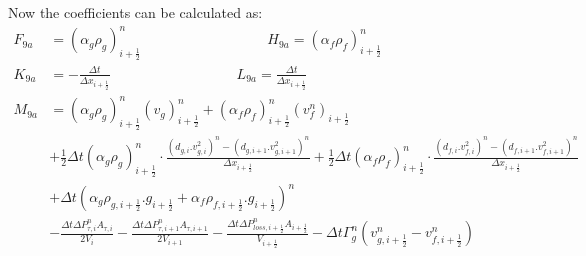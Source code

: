 \documentclass[11pt,letterpaper,titlepage]{article}
\newcommand{\half}{\frac{1}{2}}
\begin{document}
Now the coefficients can be calculated as:
\begin{equation*}
\begin{aligned}
 F_{9a} &= (\alpha_g\rho_g )_{i+\half}^{n}   \quad \quad \quad \quad \quad \quad \quad \quad \quad 
H_{9a} = (\alpha_f\rho_f )_{i+\half}^{n} \\
 K_{9a} &= -\frac{\Delta t}{\Delta x_{i+\half}} \quad \quad \quad \quad \quad \quad \quad \quad \quad 
L_{9a} =  \frac{\Delta t}{\Delta x_{i+\half}}\\
 M_{9a} &= (\alpha_g\rho_g )_{i+\half}^{n}(v_g)^{n}_{i+\half}
  +(\alpha_f\rho_f )_{i+\half}^{n}(v_f^{n})_{i+\half}\\
 &+\half \Delta t(\alpha_g \rho_{g})_{i+\half}^n \cdot\frac{(d_{g,i}.v_{g,i}^2)^n-(d_{g,i+1}.v_{g,i+1}^2)^n}{\Delta x_{i+\half}} 
 +\half \Delta t(\alpha_f \rho_{f})_{i+\half}^n \cdot\frac{(d_{f,i}.v_{f,i}^2)^n-(d_{f,i+1}.v_{f,i+1}^2)^n}{\Delta x_{i+\half}} \\
 &+ \Delta t(\alpha_g \rho_{g,i+\half}.g_{i+\half} + \alpha_f\rho_{f,i+\half}.g_{i+\half})^n\\
 &-\frac{\Delta t\Delta P_{\tau,i}^n A_{\tau,i}}{2V_i}-\frac{\Delta t\Delta P_{\tau,i+1}^n A_{\tau,i+1}}{2V_{i+1}} 
 -\frac{\Delta t\Delta P_{loss,i+\half}^n A_{i+\half}}{V_{i+\half}} - \Delta t\Gamma_g^n (v_{g,i+\half}^n - v_{f,i+\half}^n)
\end{aligned}
\end{equation*}





\newpage
\end{document}
